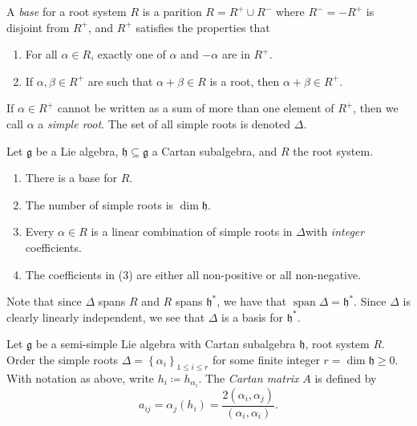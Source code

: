 \documentclass[11pt, letterpaper]{article}
\theoremstyle{plain}
\begin{document}
\begin{definition}\label{dfn:2-11}
	A \emph{base} for a root system $R$ is a parition $R = R^+ \cup R^-$ where $R^- = -R^+$ is disjoint from $R^+$, and $R^+$ satisfies the properties that
	\begin{enumerate}
		\item For all $\alpha\in R$, exactly one of $\alpha $ and $-\alpha $ are in $R^+$.
		\item If $\alpha ,\beta \in R^+$ are such that $\alpha +\beta \in R$ is a root, then $\alpha +\beta \in R^+$.
	\end{enumerate}
	If $\alpha \in R^+$ cannot be written as a sum of more than one element of $R^+$, then we call $\alpha $ a \emph{simple root}. The set of all simple roots is denoted $\Delta $.
\end{definition}

\begin{proposition}\label{prp:2-12}
	Let $\mathfrak{g} $ be a Lie algebra, $\mathfrak{h} \subseteq \mathfrak{g} $ a Cartan subalgebra, and $R$ the root system.
	\begin{enumerate}
		\item There is a base for $R$.
		\item The number of simple roots is $\dim \mathfrak{h} $.
		\item Every $\alpha \in R$ is a linear combination of simple roots in $\Delta $with \emph{integer} coefficients.
		\item The coefficients in (3) are either all non-positive or all non-negative.
	\end{enumerate}
\end{proposition}

Note that since $\Delta $ spans $R$ and $R$ spans $\mathfrak{h}^*$, we have that $\operatorname{span} \Delta =\mathfrak{h}^*$. Since $\Delta  $ is clearly linearly independent, we see that $\Delta $ is a basis for $\mathfrak{h} ^*$.

\begin{definition}\label{dfn:2-13}
	Let $\mathfrak{g} $ be a semi-simple Lie algebra with Cartan subalgebra $\mathfrak{h} $, root system $R$. Order the simple roots $\Delta =\left\{ \alpha _i \right\}_{1\leq i\leq r} $ for some finite integer $r=\dim \mathfrak{h} \geq 0$. With notation as above, write $h_i \coloneqq h_{\alpha _i} $. The \emph{Cartan matrix} $A$ is defined by
	\[
		a_{ij} =\alpha _j(h_i)=\frac{2(\alpha _i,\alpha _j)}{(\alpha _i,\alpha _i)} 
	.\]
\end{definition}
\end{document}
